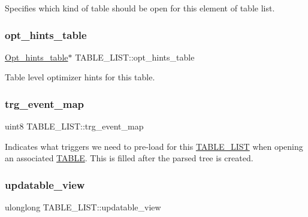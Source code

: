 Specifies which kind of table should be open for this element of table list. \mbox{\label{structTABLE__LIST_a08dcf89471efcaa22bdb31c38fa13fea}} 
\subsubsection{\texorpdfstring{opt\+\_\+hints\+\_\+table}{opt\_hints\_table}}
{\footnotesize\ttfamily \mbox{\hyperlink{classOpt__hints__table}{Opt\+\_\+hints\+\_\+table}}$\ast$ T\+A\+B\+L\+E\+\_\+\+L\+I\+S\+T\+::opt\+\_\+hints\+\_\+table}

Table level optimizer hints for this table. \mbox{\label{structTABLE__LIST_afe86284f138571126421c238a7abb863}} 
\subsubsection{\texorpdfstring{trg\+\_\+event\+\_\+map}{trg\_event\_map}}
{\footnotesize\ttfamily uint8 T\+A\+B\+L\+E\+\_\+\+L\+I\+S\+T\+::trg\+\_\+event\+\_\+map}

Indicates what triggers we need to pre-\/load for this \mbox{\hyperlink{structTABLE__LIST}{T\+A\+B\+L\+E\+\_\+\+L\+I\+ST}} when opening an associated \mbox{\hyperlink{structTABLE}{T\+A\+B\+LE}}. This is filled after the parsed tree is created. \mbox{\label{structTABLE__LIST_a77ea91b166348f6ff6711585f1a4fa5d}} 
\subsubsection{\texorpdfstring{updatable\+\_\+view}{updatable\_view}}
{\footnotesize\ttfamily ulonglong T\+A\+B\+L\+E\+\_\+\+L\+I\+S\+T\+::updatable\+\_\+view}



